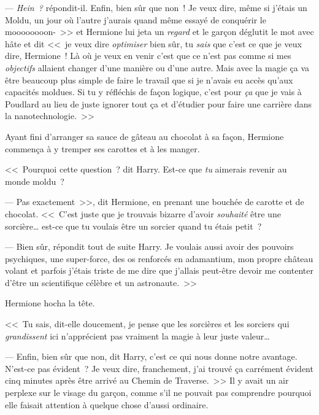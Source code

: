 --- \emph{Hein~?} répondit-il. Enfin, bien sûr que non~! Je veux dire, même si j'étais un Moldu, un jour où l'autre j'aurais quand même essayé de conquérir le moooooooon-~>> et Hermione lui jeta un \emph{regard} et le garçon déglutit le mot avec hâte et dit <<~je veux dire \emph{optimiser} bien sûr, tu \emph{sais} que c'est ce que je veux dire, Hermione~! Là où je veux en venir c'est que ce n'est pas comme si mes \emph{objectifs} allaient changer d'une manière ou d'une autre. Mais avec la magie ça va être beaucoup plus simple de faire le travail que si je n'avais eu accès qu'aux capacités moldues. Si tu y réfléchis de façon logique, c'est pour \emph{ça} que je vais à Poudlard au lieu de juste ignorer tout ça et d'étudier pour faire une carrière dans la nanotechnologie.~>>

Ayant fini d'arranger sa sauce de gâteau au chocolat à sa façon, Hermione commença à y tremper ses carottes et à les manger.

<<~Pourquoi cette question~? dit Harry. Est-ce que \emph{tu} aimerais revenir au monde moldu~?

--- Pas exactement~>>, dit Hermione, en prenant une bouchée de carotte et de chocolat. <<~C'est juste que je trouvais bizarre d'avoir \emph{souhaité} être une sorcière… est-ce que tu voulais être un sorcier quand tu étais petit~?

--- Bien sûr, répondit tout de suite Harry. Je voulais aussi avoir des pouvoirs psychiques, une super-force, des os renforcés en adamantium, mon propre château volant et parfois j'étais triste de me dire que j'allais peut-être devoir me contenter d'être un scientifique célèbre et un astronaute.~>>

Hermione hocha la tête.

<<~Tu sais, dit-elle doucement, je pense que les sorcières et les sorciers qui \emph{grandissent} ici n'apprécient pas vraiment la magie à leur juste valeur…

--- Enfin, bien sûr que non, dit Harry, c'est ce qui nous donne notre avantage. N'est-ce pas évident~? Je veux dire, franchement, j'ai trouvé ça carrément évident cinq minutes après être arrivé au Chemin de Traverse.~>> Il y avait un air perplexe sur le visage du garçon, comme s'il ne pouvait pas comprendre pourquoi elle faisait attention à quelque chose d'aussi ordinaire.
